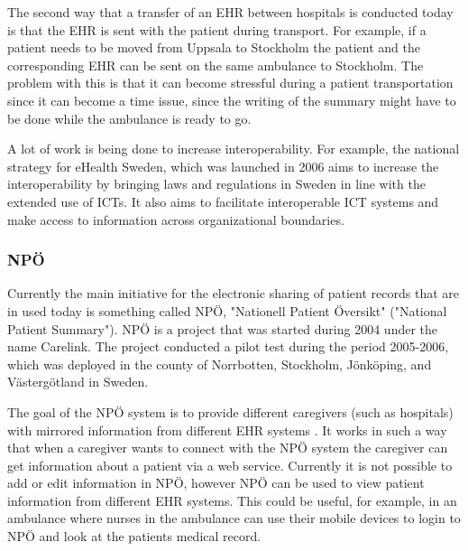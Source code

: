 \documentclass[14pt]{article}
\begin{document}
The second way that a transfer of an \gls{EHR} between hospitals is conducted today is that the \gls{EHR} is sent with the patient during transport. For example, if a patient needs to be moved from Uppsala to Stockholm the patient and the corresponding \gls{EHR} can be sent on the same ambulance to Stockholm\cite{EPJ2}. The problem with this is that it can become stressful during a patient transportation since it can become a time issue, since the writing of the summary might have to be done while the ambulance is ready to go\cite{EPJ2}.


A lot of work is being done to increase \gls{interoperability}. For example, the national strategy for eHealth Sweden, which was launched in 2006 aims to increase the interoperability by bringing laws and regulations in Sweden in line with the extended use of \glspl{ICT}. It also aims to facilitate interoperable \gls{ICT} systems and make access to information across organizational boundaries. \cite{NationalStrategy} 

\subsubsection{NPÖ} %
\label{sec:npoInterv}
Currently the main initiative for the electronic sharing of patient records that are in used today is something called NPÖ, "Nationell Patient Översikt" ("National Patient Summary"). NPÖ is a project that was started during 2004 under the name Carelink\cite{ViktorJernelov}. The project conducted a pilot test during the period 2005-2006, which was deployed in the county of Norrbotten, Stockholm, Jönköping, and Västergötland in Sweden.

The goal of the NPÖ system is to provide different caregivers (such as hospitals) with mirrored information from different \gls{EHR} systems \cite{ViktorJernelov}. It works in such a way that when a caregiver wants to connect with the NPÖ system the caregiver can get information about a patient via a web service. Currently it is not possible to add or edit information in NPÖ, however NPÖ can be used to view patient information from different \gls{EHR} systems. This could be useful, for example, in an ambulance where nurses in the ambulance can use their mobile devices to login to NPÖ and look at the patients medical record.  
\end{document}
